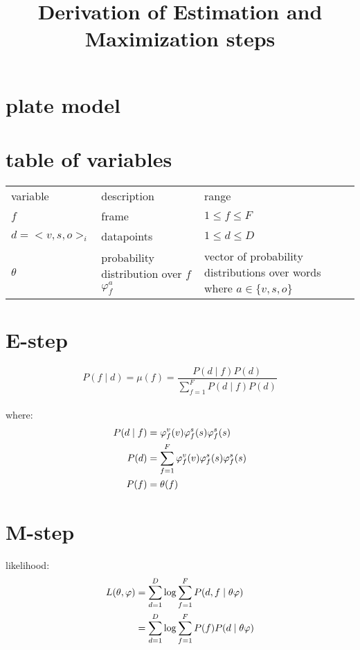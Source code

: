 \documentclass[a4-paper]{article}
\title{Derivation of Estimation and Maximization steps }
\newcommand{\vp}{\ensuremath{\varphi}}
\begin{document}
\maketitle
\section{plate model}
  
\section{table of variables}
\begin{tabular}{l l l }
  variable & description & range\\
  $f$ & frame & $ 1\leq f\leq F$\\
  $d=<v,s,o>_i$ & datapoints & $1\leq d\leq D$\\
  $\theta$ & probability distribution over $f$
  $\varphi_f^a$ & vector of probability distributions over words where $a\in\{v,s,o\}$ 
\end{tabular}

\section{E-step}

\[ P(f \mid d) = \mu(f) = \frac{P(d\mid f)P(d)}{\sum_{f=1}^F P(d\mid f) P(d)} \]\\
where:
\begin{align}
  P(d\mid f) &= \vp_f^v(v)\vp_f^s(s)\vp_f^s(s) \notag\\
  P(d) &= \sum_{f=1}^F\vp_f^v(v)\vp_f^s(s)\vp_f^s(s)\\
  P(f) &= \theta(f)
\end{align}

\section{M-step}

likelihood:
\begin{align}
  L(\theta,\vp)&=\sum_{d=1}^D\log\sum_{f=1}^FP(d,f\mid\theta\vp) \notag \\
  &=\sum_{d=1}^D\log\sum_{f=1}^FP(f)P(d\mid\theta\vp)
\end{align}
\end{document}
